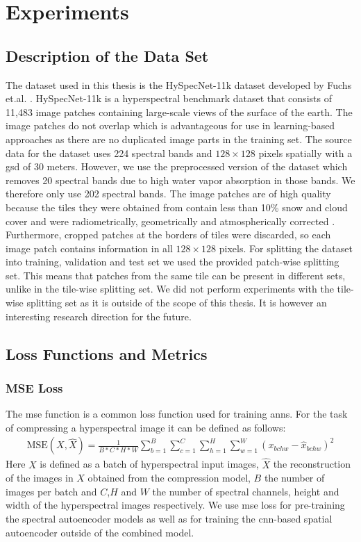 \chapter{Experiments\label{cha:chapter5}}

\section{Description of the Data Set\label{sec:dataset}}
The dataset used in this thesis is the HySpecNet-11k dataset developed by Fuchs et.al. \citep{fuchs_hyspecnet-11k_2023}. HySpecNet-11k is a hyperspectral benchmark dataset that consists of 11,483 image patches containing large-scale views of the surface of the earth. The image patches do not overlap which is advantageous for use in learning-based approaches as there are no duplicated image parts in the training set. The source data for the dataset uses 224 spectral bands and $128\times 128$ pixels spatially with a \ac{gsd} of 30 meters. However, we use the preprocessed version of the dataset which removes 20 spectral bands due to high water vapor absorption in those bands. We therefore only use 202 spectral bands. The image patches are of high quality because the tiles they were obtained from contain less than 10\% snow and cloud cover and were radiometrically, geometrically and atmospherically corrected \citep{fuchs_hyspecnet-11k_2023}. Furthermore, cropped patches at the borders of tiles were discarded, so each image patch contains information in all $128\times 128$ pixels. For splitting the dataset into training, validation and test set we used the provided patch-wise splitting set. This means that patches from the same tile can be present in different sets, unlike in the tile-wise splitting set. We did not perform experiments with the tile-wise splitting set as it is outside of the scope of this thesis. It is however an interesting research direction for the future.

\section{Loss Functions and Metrics}

\subsection{MSE Loss}
The \ac{mse} function is a common loss function used for training \acp{ann}. For the task of compressing a hyperspectral image it can be defined as follows:
\begin{align*}
\text{MSE}(X,\hat{X}) = \frac{1}{B*C*H*W} \sum_{b=1}^{B}\sum_{c=1}^{C}\sum_{h=1}^H\sum_{w=1}^W (x_{bchw} - \hat{x}_{bchw})^2
\end{align*}
Here $X$ is defined as a batch of hyperspectral input images, $\hat{X}$ the reconstruction of the images in $X$ obtained from the compression model, $B$ the number of images per batch and $C$,$H$ and $W$ the number of spectral channels, height and width of the hyperspectral images respectively.
We use \ac{mse} loss for pre-training the spectral autoencoder models as well as for training the \ac{cnn}-based spatial autoencoder outside of the combined model.

